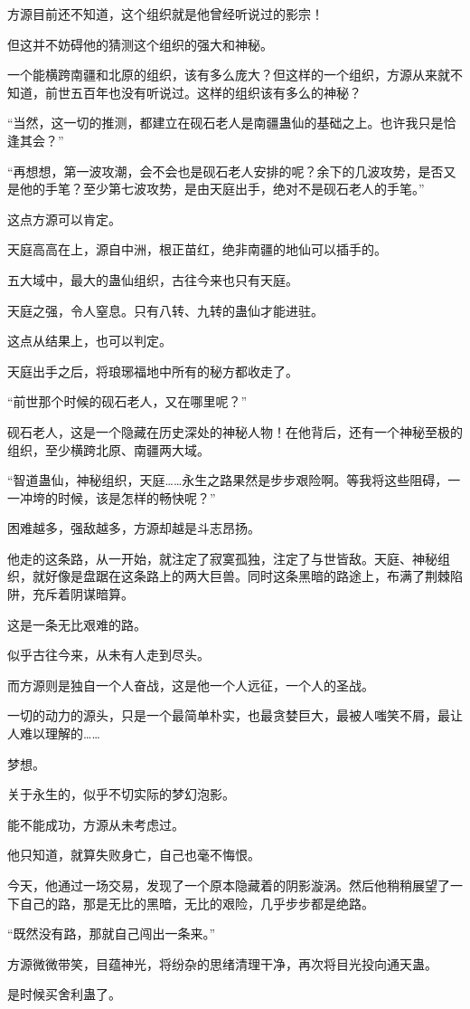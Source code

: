 \begin{this_body}
方源目前还不知道，这个组织就是他曾经听说过的影宗！

但这并不妨碍他的猜测这个组织的强大和神秘。

一个能横跨南疆和北原的组织，该有多么庞大？但这样的一个组织，方源从来就不知道，前世五百年也没有听说过。这样的组织该有多么的神秘？

“当然，这一切的推测，都建立在砚石老人是南疆蛊仙的基础之上。也许我只是恰逢其会？”

“再想想，第一波攻潮，会不会也是砚石老人安排的呢？余下的几波攻势，是否又是他的手笔？至少第七波攻势，是由天庭出手，绝对不是砚石老人的手笔。”

这点方源可以肯定。

天庭高高在上，源自中洲，根正苗红，绝非南疆的地仙可以插手的。

五大域中，最大的蛊仙组织，古往今来也只有天庭。

天庭之强，令人窒息。只有八转、九转的蛊仙才能进驻。

这点从结果上，也可以判定。

天庭出手之后，将琅琊福地中所有的秘方都收走了。

“前世那个时候的砚石老人，又在哪里呢？”

砚石老人，这是一个隐藏在历史深处的神秘人物！在他背后，还有一个神秘至极的组织，至少横跨北原、南疆两大域。

“智道蛊仙，神秘组织，天庭……永生之路果然是步步艰险啊。等我将这些阻碍，一一冲垮的时候，该是怎样的畅快呢？”

困难越多，强敌越多，方源却越是斗志昂扬。

他走的这条路，从一开始，就注定了寂寞孤独，注定了与世皆敌。天庭、神秘组织，就好像是盘踞在这条路上的两大巨兽。同时这条黑暗的路途上，布满了荆棘陷阱，充斥着阴谋暗算。

这是一条无比艰难的路。

似乎古往今来，从未有人走到尽头。

而方源则是独自一个人奋战，这是他一个人远征，一个人的圣战。

一切的动力的源头，只是一个最简单朴实，也最贪婪巨大，最被人嗤笑不屑，最让人难以理解的……

梦想。

关于永生的，似乎不切实际的梦幻泡影。

能不能成功，方源从未考虑过。

他只知道，就算失败身亡，自己也毫不悔恨。

今天，他通过一场交易，发现了一个原本隐藏着的阴影漩涡。然后他稍稍展望了一下自己的路，那是无比的黑暗，无比的艰险，几乎步步都是绝路。

“既然没有路，那就自己闯出一条来。”

方源微微带笑，目蕴神光，将纷杂的思绪清理干净，再次将目光投向通天蛊。

是时候买舍利蛊了。

\end{this_body}

